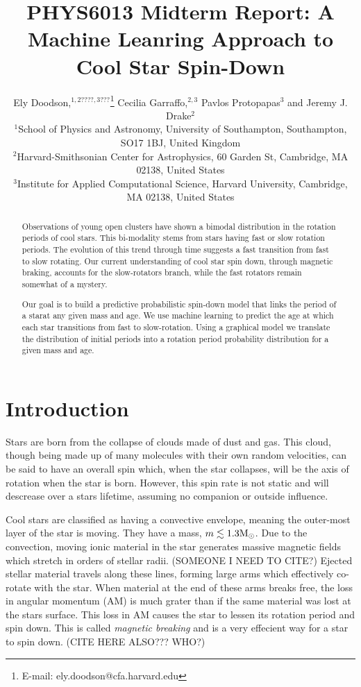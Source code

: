 \documentclass[fleqn,usenatbib]{mnras}
\title{PHYS6013 Midterm Report: A Machine Leanring Approach to Cool Star Spin-Down}
\author[E. Doodson et al.]{
Ely Doodson,$^{1,2????,3???}$\thanks{E-mail: ely.doodson@cfa.harvard.edu}
Cecilia Garraffo,$^{2,3}$
Pavlos Protopapas$^{3}$
and Jeremy J. Drake$^{2}$
\\
$^{1}$School of Physics and Astronomy, University of Southampton,
Southampton, SO17 1BJ, United Kingdom\\
$^{2}$Harvard-Smithsonian Center for Astrophysics, 60 Garden St, Cambridge, MA 02138, United States \\
$^{3}$Institute for Applied Computational Science, Harvard University, Cambridge, MA 02138, United States
}
\begin{document}
\label{firstpage}
\pagerange{\pageref{firstpage}--\pageref{lastpage}}
\maketitle

\begin{abstract}
	Observations of young open clusters have shown a bimodal distribution in the rotation
	periods of cool stars.
	This bi-modality stems from stars having fast or slow rotation periods.
	The evolution of this trend through time suggests a fast transition from fast to slow rotating.
	Our current understanding of cool star spin down, through magnetic braking, accounts for the slow-rotators branch, while the fast rotators remain somewhat of a mystery.

	Our goal is to build a predictive probabilistic spin-down model that links the period of a starat any given mass and age.
	We use machine learning to predict the age at which each star transitions from fast to slow-rotation.
	Using a graphical model we translate the distribution of initial periods into a rotation period probability distribution for a given mass and age.
\end{abstract}


\section{Introduction}
Stars are born from the collapse of clouds made of dust and gas.
This cloud, though being made up of many molecules with their own random velocities, can be said to have an overall spin which, when the star collapses, will be the axis of rotation when the star is born.
However, this spin rate is not static and will descrease over a stars lifetime, assuming no companion or outside influence.

Cool stars are classified as having a convective envelope, meaning the outer-most layer of the star is moving.
They have a mass, $m \lesssim 1.3 \textup{M}_\odot$. 
Due to the convection, moving ionic material in the star generates massive magnetic fields which stretch in orders of stellar radii. (SOMEONE I NEED TO CITE?)
Ejected stellar material travels along these lines, forming large arms which effectively co-rotate with the star.
When material at the end of these arms breaks free, the loss in angular momentum (AM) is much grater than if the same material was lost at the stars surface.
This loss in AM causes the star to lessen its rotation period and spin down.
This is called \textit{magnetic breaking} and is a very effecient way for a star to spin down. (CITE HERE ALSO??? WHO?)
\end{document}
